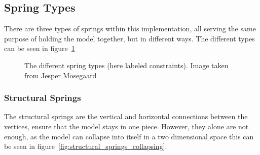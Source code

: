 \subsection{Spring Types}
There are three types of springs within this implementation, all serving the same purpose of holding the model together,
but in different ways. The different types can be seen in figure~\ref{fig:spring_types}
\begin{figure}
    \centering
    \caption{The different spring types (here labeled constraints). Image taken from Jesper Mosegaard\cite{mosegaards_clothing_simulation}}
    \label{fig:spring_types}
\end{figure}

\subsubsection{Structural Springs}
The structural springs are the vertical and horizontal connections between the vertices,
ensure that the model stays in one piece.
However, they alone are not enough, as the model can collapse into itself in a two dimensional space\cite{jeff_lander_real_time_cloth} this can be seen in figure~\ref{fig:structural_springs_collapsing}.

